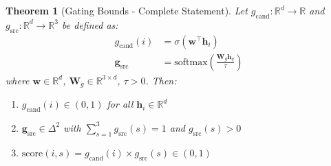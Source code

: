 \documentclass[11pt]{article}
\newtheorem{theorem}{Theorem}
\begin{document}
\begin{theorem}[Gating Bounds - Complete Statement]
\label{thm:bounds_full}
Let $g_{\text{cand}}: \mathbb{R}^d \to \mathbb{R}$ and $g_{\text{src}}: \mathbb{R}^d \to \mathbb{R}^3$ be defined as:
\begin{align}
g_{\text{cand}}(i) &= \sigma(\mathbf{w}^\top \mathbf{h}_i) \\
\mathbf{g}_{\text{src}} &= \text{softmax}\left(\frac{\mathbf{W}_g \mathbf{h}_q}{\tau}\right)
\end{align}
where $\mathbf{w} \in \mathbb{R}^d$, $\mathbf{W}_g \in \mathbb{R}^{3 \times d}$, $\tau > 0$. Then:
\begin{enumerate}
    \item $g_{\text{cand}}(i) \in (0, 1)$ for all $\mathbf{h}_i \in \mathbb{R}^d$
    \item $\mathbf{g}_{\text{src}} \in \Delta^2$ with $\sum_{s=1}^3 g_{\text{src}}(s) = 1$ and $g_{\text{src}}(s) > 0$
    \item $\text{score}(i, s) = g_{\text{cand}}(i) \times g_{\text{src}}(s) \in (0, 1)$
\end{enumerate}
\end{theorem}
\end{document}
